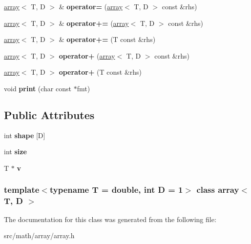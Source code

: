 \begin{DoxyCompactItemize}
\item 
\hypertarget{classarray_ae6ce8cec926e8422a243f9d189296265}{
\hyperlink{classarray}{array}$<$ T, D $>$ \& {\bfseries operator=} (\hyperlink{classarray}{array}$<$ T, D $>$ const \&rhs)}
\label{classarray_ae6ce8cec926e8422a243f9d189296265}

\item 
\hypertarget{classarray_af1ee5ea8e9a153ffc26a513e442916a1}{
\hyperlink{classarray}{array}$<$ T, D $>$ \& {\bfseries operator+=} (\hyperlink{classarray}{array}$<$ T, D $>$ const \&rhs)}
\label{classarray_af1ee5ea8e9a153ffc26a513e442916a1}

\item 
\hypertarget{classarray_a707d31f0cd68cf8c29578ceeffd4f160}{
\hyperlink{classarray}{array}$<$ T, D $>$ \& {\bfseries operator+=} (T const \&rhs)}
\label{classarray_a707d31f0cd68cf8c29578ceeffd4f160}

\item 
\hypertarget{classarray_ad2d3f9c01dd2e53e0575f25d99fa5332}{
\hyperlink{classarray}{array}$<$ T, D $>$ {\bfseries operator+} (\hyperlink{classarray}{array}$<$ T, D $>$ const \&rhs)}
\label{classarray_ad2d3f9c01dd2e53e0575f25d99fa5332}

\item 
\hypertarget{classarray_aa8116676705ae21a643f3fa6fbfc8d16}{
\hyperlink{classarray}{array}$<$ T, D $>$ {\bfseries operator+} (T const \&rhs)}
\label{classarray_aa8116676705ae21a643f3fa6fbfc8d16}

\item 
\hypertarget{classarray_afaaffd8caa1ff3e9b0c676bce63b4620}{
void {\bfseries print} (char const $\ast$fmt)}
\label{classarray_afaaffd8caa1ff3e9b0c676bce63b4620}

\end{DoxyCompactItemize}
\subsection*{Public Attributes}
\begin{DoxyCompactItemize}
\item 
\hypertarget{classarray_a26bbf20751fa00968b42384186ffa1f0}{
int {\bfseries shape} \mbox{[}D\mbox{]}}
\label{classarray_a26bbf20751fa00968b42384186ffa1f0}

\item 
\hypertarget{classarray_aece99778954bbd58c36a3ca2a1eb6122}{
int {\bfseries size}}
\label{classarray_aece99778954bbd58c36a3ca2a1eb6122}

\item 
\hypertarget{classarray_ac0f2991b5e69fca9e7b8882b6910492a}{
T $\ast$ {\bfseries v}}
\label{classarray_ac0f2991b5e69fca9e7b8882b6910492a}

\end{DoxyCompactItemize}
\subsubsection*{template$<$typename T = double, int D = 1$>$ class array$<$ T, D $>$}



The documentation for this class was generated from the following file:\begin{DoxyCompactItemize}
\item 
src/math/array/array.h\end{DoxyCompactItemize}
